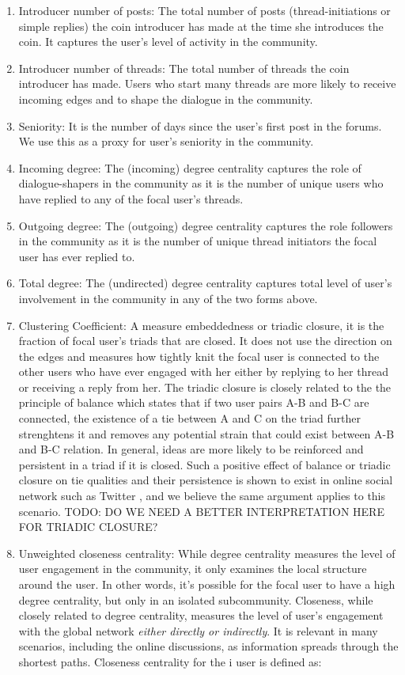 \begin{enumerate}[topsep=0pt,itemsep=-0.5ex,partopsep=1ex,parsep=1ex]
  \item{Introducer number of posts:} The total number of posts (thread-initiations or simple replies) the coin introducer has made at the time she introduces the coin. It captures the user's level of activity in the community.
  \item{Introducer number of threads:} The total number of threads the coin introducer has made. Users who start many threads are more likely to receive incoming edges and to shape the dialogue in the community.
  \item{Seniority:} It is the number of days since the user's first post in the forums. We use this as a proxy for user's seniority in the community.
  \item{Incoming degree:} The (incoming) degree centrality captures the role of dialogue-shapers in the community as it is the number of unique users who have replied to any of the focal user's threads.
  \item{Outgoing degree:} The (outgoing) degree centrality captures the role followers in the community as it is the number of unique thread initiators the focal user has ever replied to.
  \item{Total degree:} The (undirected) degree centrality captures total level of user's involvement in the community in any of the two forms above.
  \item{Clustering Coefficient:} A measure embeddedness or triadic closure, it is the fraction of focal user's triads that are closed. It does not use the direction on the edges and measures how tightly knit the focal user is connected to the other users who have ever engaged with her either by replying to her thread or receiving a reply from her. The triadic closure is closely related to the the principle of balance which states that if two user pairs A-B and B-C are connected, the existence of a tie between A and C on the triad further strenghtens it and removes any potential strain that could exist between A-B and B-C relation. In general, ideas are more likely to be reinforced and persistent in a triad if it is closed. Such a positive effect of balance or triadic closure on tie qualities and their persistence is shown to exist in online social network such as Twitter \cite{KleinbergBalance}, and we believe the same argument applies to this scenario.
  TODO: DO WE NEED A BETTER INTERPRETATION HERE FOR TRIADIC CLOSURE?
  \item{Unweighted closeness centrality:} While degree centrality measures the level of user engagement in the community, it only examines the local structure around the user. In other words, it's possible for the focal user to have a high degree centrality, but only in an isolated subcommunity. Closeness, while closely related to degree centrality, measures the level of user's engagement with the global network \textit{either directly or indirectly}. It is relevant in many scenarios, including the online discussions, as information spreads through the shortest paths. Closeness centrality for the i user is defined as:

\end{enumerate}
